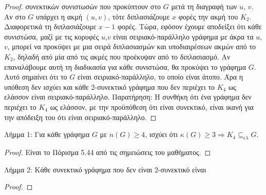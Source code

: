 \documentclass[a4paper, oneside, 11pt]{article}
\begin{document}
\begin{enumerate}
\begin{proof}
συνεκτικών συνιστωσών που προκύπτουν στο $G$ μετά τη διαγραφή των $u$, $v$. Αν στο $G$ υπάρχει η ακμή $(u,v)$, τότε διπλασιάζουμε $x$ φορές την ακμή του $K_2$. Διαφορετικά τη διπλασιάζουμε $x-1$ φορές.
Τώρα, εφόσον έχουμε αποδείξει ότι κάθε συνιστώσα, μαζί με τις κορυφές $u$,$v$ είναι σειριακό-παράλληλο γράφημα με άκρα τα $u$, $v$, μπορεί να προκύψει με μια σειρά διπλασιασμών και υποδιαιρέσεων ακμών
από το $K_2$, δηλαδή από μία από τις ακμές που προέκυψαν από το διπλασιασμό. Αν επαναλάβουμε αυτή τη διαδικασία για κάθε συνιστώσα, θα προκύψει το γράφημα $G$. Αυτό σημαίνει ότι το $G$ είναι 
σειριακό-παράλληλο, το οποίο είναι άτοπο. Άρα η υπόθεση δεν ισχύει και κάθε 2-συνεκτικό γράφημα που δεν περιέχει το $K_4$ ως ελάσσον είναι σειριακό-παράλληλο. Παρατήρηση: Η συνθήκη ότι ένα γράφημα
δεν περιέχει το $K_4$ ως ελάσσον, με την προϋπόθεση ότι είναι συνεκτικό, είναι ικανή για την απόδειξη του ότι είναι σειριακό-παράλληλο.
	\end{proof}     
Λήμμα 1: Για κάθε γράφημα $G$ με $n(G)\geq 4$, ισχύει ότι $\kappa(G)\geq 3 \Rightarrow K_4 \subseteq_{\epsilon\lambda} G$.
	\begin{proof}
Είναι το Πόρισμα 5.44 από τις σημειώσεις του μαθήματος.
	\end{proof}
Λήμμα 2: Κάθε συνεκτικό γράφημα που δεν είναι 2-συνεκτικό είναι 
	\begin{proof}

	\end{proof}
 
\end{enumerate}
\end{document}

